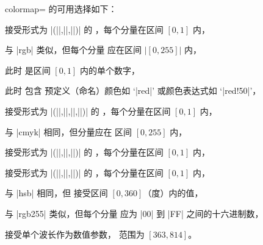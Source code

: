 \begin{pgfplotskey}{colormap=}
     的可用选择如下：
    \begin{description}
        \item {} 接受形式为
            |(||,||,||)| 的
            ，每个分量在区间 $[0,1]$ 内，
        \item {} 与 |rgb| 类似，但每个分量
            应在区间 $|[0,255]|$ 内，
        \item {} 此时  是区间
            $[0,1]$ 内的单个数字，
        \item {} 此时  包含
            预定义（命名）颜色如 `|red|' 或颜色表达式如 `|red!50|'，
        \item {} 接受形式为
            |(||,||,||,||)|
            的 ，每个分量在区间 $[0,1]$ 内，
        \item {} 与 |cmyk| 相同，但分量应在
            区间 $[0,255]$ 内，
        \item {} 接受形式为
            |(||,||,||)| 的
            ，每个分量在区间 $[0,1]$ 内，
        \item {} 接受形式为
            |(||,||,||)| 的
            ，每个分量在区间 $[0,1]$ 内，
        \item {} 与 |hsb| 相同，但 
            接受区间 $[0,360]$（度）内的值，
        \item {} 与 |rgb255| 类似，但每个分量
            应为 |00| 到 |FF| 之间的十六进制数，
        \item {} 接受单个波长作为数值参数，
            范围为 $[363,814]$。
    \end{description}

\begin{codeexample}[]
\end{codeexample}


\end{pgfplotskey}
